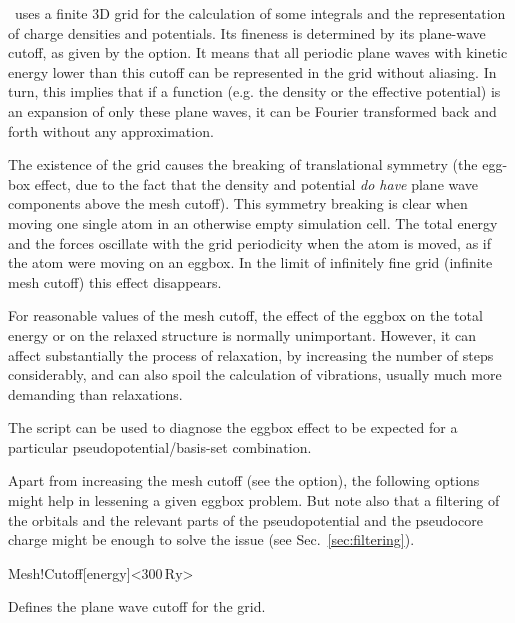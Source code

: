 \siesta\ uses a finite 3D grid for the calculation of some
integrals and the representation of charge densities and potentials.
Its fineness is determined by its plane-wave cutoff, as
given by the option. It means that all periodic
plane waves with kinetic energy lower than this cutoff 
can be represented in the grid without aliasing. In turn,
this implies that if a function (e.g. the density or the 
effective potential) is an expansion of
only these plane waves, it can be Fourier transformed
back and forth without any approximation.

The existence of the grid causes the breaking of translational
symmetry (the egg-box effect, due to the fact that the density
and potential \emph{do have} plane wave components above
the mesh cutoff).  This symmetry breaking is clear when
moving one single atom in an otherwise empty simulation cell. The
total energy and the forces oscillate with the grid periodicity when
the atom is moved, as if the atom were moving on an eggbox. In the
limit of infinitely fine grid (infinite mesh cutoff) this effect
disappears.

For reasonable values of the mesh cutoff, the effect of the eggbox
on the total energy or on the relaxed structure is normally unimportant.
However, it can affect substantially the process of relaxation, by
increasing the number of steps considerably, and can also spoil the
calculation of vibrations, usually much more demanding than relaxations.

The  script can be used to
diagnose the eggbox effect to be expected for a particular
pseudopotential/basis-set combination.

Apart from increasing the mesh cutoff (see the  option),
the following options might help in lessening a given eggbox problem. But
note also that a filtering of the orbitals and the relevant parts of
the pseudopotential and the pseudocore charge might be enough to solve
the issue (see Sec.~\ref{sec:filtering}).

\begin{fdfentry}{Mesh!Cutoff}[energy]<$300\,\mathrm{Ry}$>

  Defines the plane wave cutoff for the grid.
  
 
\end{fdfentry}

